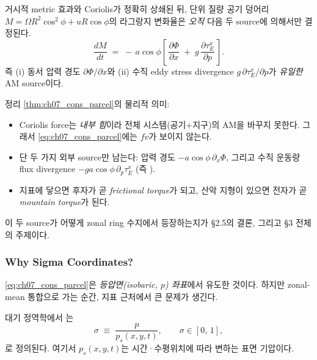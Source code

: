 \begin{theorem}\label{thm:ch07_cons_parcel}
거시적 metric 효과와 Coriolis가 정확히 상쇄된 뒤, 단위 질량 공기 덩어리
$M = \Omega R^2\cos^2\phi + u R\cos\phi$의 라그랑지 변화율은 \emph{오직} 다음
두 source에 의해서만 결정된다.
\begin{equation}\label{eq:ch07_cons_parcel}
  \boxed{\;
  \frac{d M}{dt}
  \;=\;
  -\, a\cos\phi
  \left[\,
    \frac{\partial \Phi}{\partial x}
    \;+\;
    g\,\frac{\partial \tau_E^x}{\partial p}
  \,\right].
  \;}
\end{equation}
즉 (i) 동서 압력 경도 $\partial\Phi/\partial x$와 (ii) 수직 eddy stress
divergence $g\,\partial\tau_E^x/\partial p$가 \emph{유일한} AM source이다.
\end{theorem}

\begin{hisublock}
정리 \ref{thm:ch07_cons_parcel}의 물리적 의미:
\begin{itemize}
  \item Coriolis force는 \emph{내부 힘}이라 전체 시스템(공기+지구)의 AM을 바꾸지
        못한다.  그래서 \eqref{eq:ch07_cons_parcel}에는 $f v$가 보이지 않는다.
  \item 단 두 가지 외부 source만 남는다: 압력 경도 $-a\cos\phi\,\partial_x\Phi$,
        그리고 수직 운동량 flux divergence $-g a\cos\phi\,\partial_p \tau_E^x$
        (즉 ).
  \item 지표에 닿으면 후자가 곧 \emph{frictional torque}가 되고, 산악 지형이
        있으면 전자가 곧 \emph{mountain torque}가 된다.
\end{itemize}
이 두 source가 어떻게 zonal ring 수지에서 등장하는지가 \S2.5의 결론, 그리고 \S3
전체의 주제이다.
\end{hisublock}

\subsubsection{Why Sigma Coordinates?}

\eqref{eq:ch07_cons_parcel}은 \emph{등압면(isobaric, $p$) 좌표}에서 유도한
것이다.  하지만 zonal-mean 통합으로 가는 순간, 지표 근처에서 큰 문제가 생긴다.

\begin{definition}\label{def:ch07_cons_sigma}
대기 정역학에서 는
\begin{equation}\label{eq:ch07_cons_sigma_def}
  \sigma \;\equiv\; \frac{p}{p_s(x,y,t)},
  \qquad
  \sigma \in [0,\,1],
\end{equation}
로 정의된다.  여기서 $p_s(x,y,t)$는 시간·수평위치에 따라 변하는 표면 기압이다.
\end{definition}

